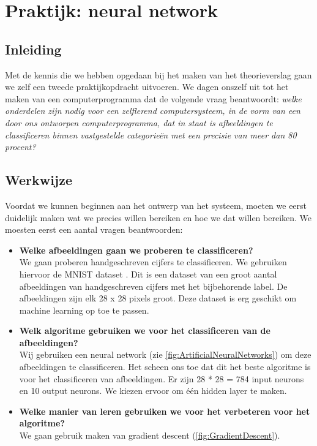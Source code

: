 \section{Praktijk: neural network}

\subsection{Inleiding}
Met de kennis die we hebben opgedaan bij het maken van het theorieverslag gaan we zelf een tweede praktijkopdracht uitvoeren. We dagen onszelf uit tot het maken van een computerprogramma dat de volgende vraag beantwoordt: \textit{welke onderdelen zijn nodig voor een zelflerend computersysteem, in de vorm van een door ons ontworpen computerprogramma, dat in staat is afbeeldingen te classificeren binnen vastgestelde categorie\"en met een precisie van meer dan 80 procent?}

\subsection{Werkwijze}
Voordat we kunnen beginnen aan het ontwerp van het systeem, moeten we eerst duidelijk maken wat we precies willen bereiken en hoe we dat willen bereiken. We moesten eerst een aantal vragen beantwoorden:\\
\begin{itemize}  
\item\textbf{Welke afbeeldingen gaan we proberen te classificeren?}\\
We gaan proberen handgeschreven cijfers te classificeren. We gebruiken hiervoor de MNIST dataset \cite{MNIST}. Dit is een dataset van een groot aantal afbeeldingen van handgeschreven cijfers met het bijbehorende label. De afbeeldingen zijn elk 28 x 28 pixels groot. Deze dataset is erg geschikt om machine learning op toe te passen.
\item\textbf{Welk algoritme gebruiken we voor het classificeren van de afbeeldingen?}\\
Wij gebruiken een neural network (zie \ref{fig:ArtificialNeuralNetworks}) om deze afbeeldingen te classificeren. Het scheen ons toe dat dit het beste algoritme is voor het classificeren van afbeeldingen. Er zijn 28 * 28 = 784 input neurons en 10 output neurons. We kiezen ervoor om \'e\'en hidden layer te maken.
\item\textbf{Welke manier van leren gebruiken we voor het verbeteren voor het algoritme?}\\
We gaan gebruik maken van gradient descent (\ref{fig:GradientDescent}).
\end{itemize}

